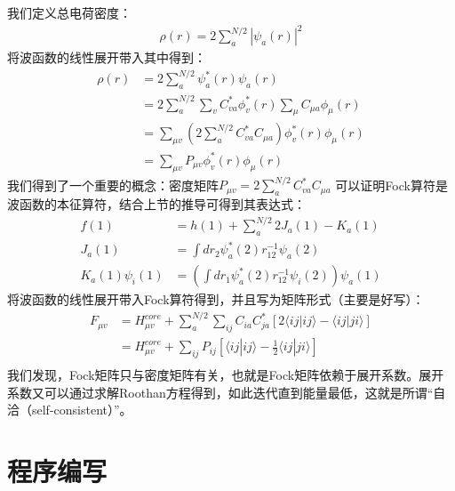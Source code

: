 \documentclass[12pt, a4paper, oneside]{ctexart}
\begin{document}
我们定义总电荷密度：
\begin{equation}
\begin{aligned}
\rho(r)=2\sum_a^{N/2}|\psi_a(r)|^2
\end{aligned}
\end{equation}
将波函数的线性展开带入其中得到：
\begin{equation}
\begin{aligned}
\rho(r)&=2\sum_a^{N/2}\psi_a^*(r)\psi_a(r)\\
&=2\sum_a^{N/2}\sum_vC_{va}^*\phi_v^*(r)\sum_{\mu}C_{\mu a}\phi_{\mu}(r)\\
&=\sum_{\mu v}\left(2\sum_a^{N/2}C_{va}^*C_{\mu a}\right)\phi_v^*(r)\phi_{\mu}(r)\\
&=\sum_{\mu v}P_{\mu v}\phi_v^*(r)\phi_{\mu}(r)
\end{aligned}
\end{equation}
我们得到了一个重要的概念：密度矩阵$P_{\mu v}=2\sum_a^{N/2}C_{va}^*C_{\mu a}$
可以证明Fock算符是波函数的本征算符，结合上节的推导可得到其表达式：
\begin{equation}
\begin{aligned}
f(1)&=h(1)+\sum_{a}^{N/2}2J_{a}(1)-K_{a}(1)\\
J_a(1)&=\int dr_2\psi_a^*(2)r_{12}^{-1}\psi_a(2)\\
K_a(1)\psi_i(1)&=\left(\int dr_1\psi_a^*(2)r_{12}^{-1}\psi_i(2)\right)\psi_a(1)
\end{aligned}
\end{equation}
将波函数的线性展开带入Fock算符得到，并且写为矩阵形式（主要是好写）：
\begin{equation}
\begin{aligned}
F_{\mu v}&=H_{\mu v}^{core}+\sum_a^{N/2}\sum_{ij}C_{ia}C_{ja}^*[2\langle ij|ij\rangle-\langle ij|ji\rangle]\\
&=H_{\mu v}^{core}+\sum_{ij}P_{ij}[\langle ij|ij\rangle-\frac12\langle ij|ji\rangle]\\
\end{aligned}
\end{equation}
我们发现，Fock矩阵只与密度矩阵有关，也就是Fock矩阵依赖于展开系数。展开系数又可以通过求解Roothan方程得到，如此迭代直到能量最低，这就是所谓“自洽（self-consistent）”。

\newpage

\section{程序编写}
\end{document}
